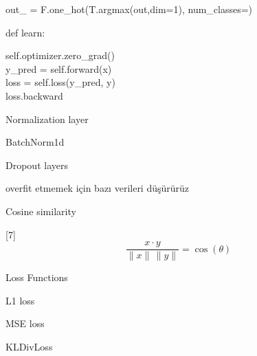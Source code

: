 \documentclass[11pt,a4paper]{article}
\begin{document}
out\_ = F.one\_hot(T.argmax(out,dim=1), num\_classes=)

def learn:

self.optimizer.zero\_grad()\\
\hspace*{1em}y\_pred = self.forward(x)\\
\hspace*{2em}loss = self.loss(y\_pred, y)\\
\hspace*{3em}loss.backward

Normalization layer

\hspace{2em}BatchNorm1d

Dropout layers

overfit etmemek için bazı verileri düşürürüz

Cosine similarity

[7]
\[ \frac{x\cdot y}{\|x\|\,\|y\|} = \cos(\theta) \]

Loss Functions

\hspace{2em}L1 loss

\hspace{2em}MSE loss

\hspace{2em}KLDivLoss
\end{document}
